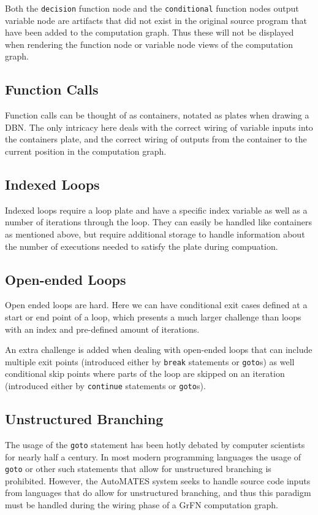 Both the \texttt{decision} function node and the \texttt{conditional} function nodes output variable node are artifacts that did not exist in the original source program that have been added to the computation graph. Thus these will not be displayed when rendering the function node or variable node views of the computation graph.

\subsection{Function Calls\label{sec:func_calls}}
Function calls can be thought of as containers, notated as plates when drawing a DBN. The only intricacy here deals with the correct wiring of variable inputs into the containers plate, and the correct wiring of outputs from the container to the current position in the computation graph.

\subsection{Indexed Loops\label{sec:idx_loops}}
Indexed loops require a loop plate and have a specific index variable as well as a number of iterations through the loop. They can easily be handled like containers as mentioned above, but require additional storage to handle information about the number of executions needed to satisfy the plate during compuation.

\subsection{Open-ended Loops\label{sec:open_loops}}
Open ended loops are hard. Here we can have conditional exit cases defined at a start or end point of a loop, which presents a much larger challenge than loops with an index and pre-defined amount of iterations.

An extra challenge is added when dealing with open-ended loops that can include multiple exit points (introduced either by \texttt{break} statements or \texttt{goto}s) as well conditional skip points where parts of the loop are skipped on an iteration (introduced either by \texttt{continue} statements or \texttt{goto}s).

\subsection{Unstructured Branching\label{sec:branching}}
The usage of the \texttt{goto} statement has been hotly debated by computer scientists for nearly half a century. In most modern programming languages the usage of  \texttt{goto} or other such statements that allow for unstructured branching is prohibited. However, the AutoMATES system seeks to handle source code inputs from languages that do allow for unstructured branching, and thus this paradigm must be handled during the wiring phase of a GrFN computation graph.

